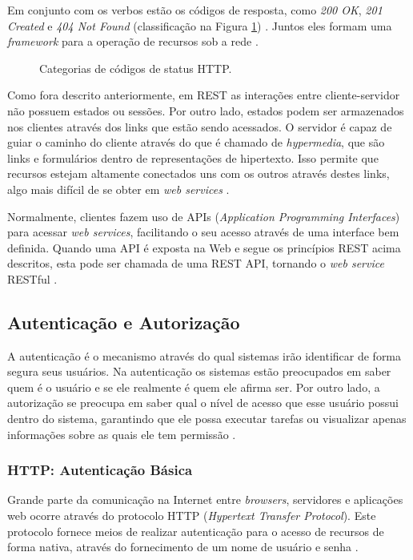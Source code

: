 \documentclass[diss]{template/setrem}
\begin{document}
Em conjunto com os verbos estão os códigos de resposta, como \emph{200 OK}, \emph{201 Created} e \emph{404 Not Found} (classificação na Figura \ref{fig:http-status-codes}) . Juntos eles formam uma \emph{framework} para a operação de recursos sob a rede \citep{Webber2010}.

\begin{figure}[!h]
    \caption{Categorias de códigos de status HTTP.}
    \label{fig:http-status-codes}
\end{figure}

Como fora descrito anteriormente, em REST as interações entre cliente-servidor não possuem estados ou sessões. Por outro lado, estados podem ser armazenados nos clientes através dos links que estão sendo acessados. O servidor é capaz de guiar o caminho do cliente através do que é chamado de \emph{hypermedia}, que são links e formulários dentro de representações de hipertexto. Isso permite que recursos estejam altamente conectados uns com os outros através destes links, algo mais difícil de se obter em \emph{web services} \citep{Richardson2007}.

Normalmente, clientes fazem uso de APIs (\emph{Application Programming Interfaces}) para acessar \emph{web services}, facilitando o seu acesso através de uma interface bem definida. Quando uma API é exposta na Web e segue os princípios REST acima descritos, esta pode ser chamada de uma REST API, tornando o \emph{web service} RESTful \citep{Masse2011}.

\subsection{Autenticação e Autorização}
\label{subsec:autenticao}
A autenticação é o mecanismo através do qual sistemas irão identificar de forma segura seus usuários. Na autenticação os sistemas estão preocupados em saber quem é o usuário e se ele realmente é quem ele afirma ser. Por outro lado, a autorização se preocupa em saber qual o nível de acesso que esse usuário possui dentro do sistema, garantindo que ele possa executar tarefas ou visualizar apenas informações sobre as quais ele tem permissão \citep{Carter2012}.

\subsubsection{HTTP: Autenticação Básica}
Grande parte da comunicação na Internet entre \emph{browsers}, servidores e aplicações web ocorre através do protocolo HTTP (\emph{Hypertext Transfer Protocol}). Este protocolo fornece meios de realizar autenticação para o acesso de recursos de forma nativa, através do fornecimento de um nome de usuário e senha \citep{Gourley2002}.
\end{document}
